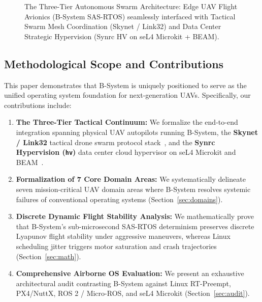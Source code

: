 \documentclass[10pt,journal,compsoc,twocolumn]{article}
\begin{document}
\begin{figure}[t]
\caption{The Three-Tier Autonomous Swarm Architecture: Edge UAV Flight Avionics (B-System SAS-RTOS) seamlessly interfaced with Tactical Swarm Mesh Coordination (Skynet / Link32) and Data Center Strategic Hypervision (Synrc HV on seL4 Microkit + BEAM).}
\label{fig:continuum_architecture}
\end{figure}

\subsection{Methodological Scope and Contributions}
This paper demonstrates that B-System is uniquely positioned to serve as the unified operating system foundation for next-generation UAVs. Specifically, our contributions include:
\begin{enumerate}[leftmargin=*]
    \item \textbf{The Three-Tier Tactical Continuum:} We formalize the end-to-end integration spanning physical UAV autopilots running B-System, the \textbf{Skynet / Link32} tactical drone swarm protocol stack~\cite{tonpa2025skynet}, and the \textbf{Synrc Hypervision (\texttt{hv})} data center cloud hypervisor on seL4 Microkit and BEAM~\cite{synrc_hv_spec}.
    \item \textbf{Formalization of 7 Core Domain Areas:} We systematically delineate seven mission-critical UAV domain areas where B-System resolves systemic failures of conventional operating systems (Section~\ref{sec:domains}).
    \item \textbf{Discrete Dynamic Flight Stability Analysis:} We mathematically prove that B-System's sub-microsecond SAS-RTOS determinism preserves discrete Lyapunov flight stability under aggressive maneuvers, whereas Linux scheduling jitter triggers motor saturation and crash trajectories (Section~\ref{sec:math}).
    \item \textbf{Comprehensive Airborne OS Evaluation:} We present an exhaustive architectural audit contrasting B-System against Linux RT-Preempt, PX4/NuttX, ROS 2 / Micro-ROS, and seL4 Microkit (Section~\ref{sec:audit}).
\end{enumerate}
\end{document}
